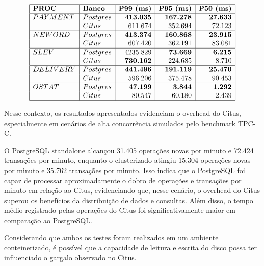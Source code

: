 \[
\begin{array}{|l|l|r|r|r|}
\hline
\textbf{PROC} & \textbf{Banco} & \textbf{P99 (ms)} & \textbf{P95 (ms)} & \textbf{P50 (ms)} \\
\hline
PAYMENT & Postgres & \textbf{413.035} & \textbf{167.278} & \textbf{27.633} \\
        & Citus    & 611.674          & 352.694          & 72.123 \\
\hline
NEWORD  & Postgres & \textbf{413.374} & \textbf{160.868} & \textbf{23.915} \\
        & Citus    & 607.420          & 362.191          & 83.081 \\
\hline
SLEV    & Postgres & 4235.829         & \textbf{73.669}  & \textbf{6.215} \\
        & Citus    & \textbf{730.162} & 224.685          & 8.710 \\
\hline
DELIVERY& Postgres & \textbf{441.496} & \textbf{191.119} & \textbf{25.470} \\
        & Citus    & 596.206          & 375.478          & 90.453 \\
\hline
OSTAT   & Postgres & \textbf{47.199}  & \textbf{3.844}   & \textbf{1.292} \\
        & Citus    & 80.547           & 60.180           & 2.439 \\
\hline
\end{array}
\]

Nesse contexto, os resultados apresentados evidenciam o overhead do Citus, especialmente em cenários de alta concorrência simulados pelo benchmark TPC-C.

O PostgreSQL standalone alcançou 31.405 operações novas por minuto e 72.424 transações por minuto, 
enquanto o clusterizado atingiu 15.304 operações novas por minuto e 35.762 transações por minuto.
Isso indica que o PostgreSQL foi capaz de processar aproximadamente o dobro de operações e transações por minuto em relação ao Citus,
evidenciando que, nesse cenário, o overhead do Citus superou os benefícios da distribuição de dados e consultas.
Além disso, o tempo médio registrado pelas operações do Citus foi significativamente maior em comparação ao PostgreSQL.

Considerando que ambos os testes foram realizados em um ambiente conteinerizado, é possível que 
a capacidade de leitura e escrita do disco possa ter influenciado o gargalo observado no Citus.
